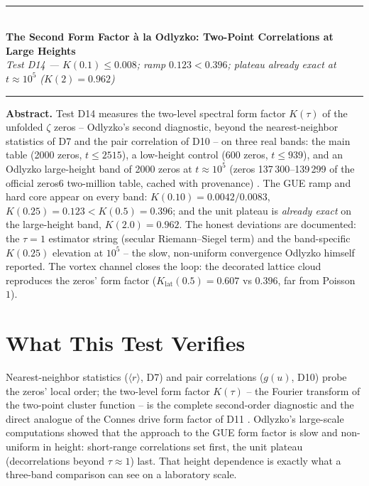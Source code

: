 \documentclass[11pt,a4paper]{article}
\begin{document}
\\[0.3em]
\rule{\textwidth}{0.8pt}\\[0.6em]
{\LARGE\bfseries\color{labblue} The Second Form Factor à la Odlyzko: Two-Point Correlations at Large Heights}\\[0.5em]
{\normalsize\itshape Test D14 — $K(0.1) \le 0.008$; ramp $0.123 < 0.396$; plateau already exact at $t \approx 10^5$ ($K(2) = 0.962$)}\\[0.4em]
\rule{\textwidth}{0.4pt}

\begin{tcolorbox}[colback=labgreen!8, colframe=labgreen!70!black, title={Verdict: PASS — 10/10 checks}, fonttitle=\bfseries, boxrule=0.6pt]
\textbf{Abstract.} Test D14 measures the two-level spectral form factor $K(\tau)$ of the unfolded $\zeta$ zeros -- Odlyzko's second diagnostic, beyond the nearest-neighbor statistics of D7 and the pair correlation of D10 -- on three real bands: the main table (2000 zeros, $t \le 2515$), a low-height control (600 zeros, $t \le 939$), and an Odlyzko large-height band of 2000 zeros at $t \approx 10^{5}$ (zeros 137\,300--139\,299 of the official zeros6 two-million table, cached with provenance) \cite{odlyzko,odlyzko2}. The GUE ramp and hard core appear on every band: $K(0.10) = 0.0042/0.0083$, $K(0.25) = 0.123 < K(0.5) = 0.396$; and the unit plateau is \emph{already exact} on the large-height band, $K(2.0) = 0.962$. The honest deviations are documented: the $\tau = 1$ estimator string (secular Riemann--Siegel term) and the band-specific $K(0.25)$ elevation at $10^5$ -- the slow, non-uniform convergence Odlyzko himself reported. The vortex channel closes the loop: the decorated lattice cloud reproduces the zeros' form factor ($K_{\mathrm{lat}}(0.5) = 0.607$ vs $0.396$, far from Poisson $1$).
\end{tcolorbox}

\section{What This Test Verifies}
Nearest-neighbor statistics ($\langle r\rangle$, D7) and pair correlations ($g(u)$, D10) probe the zeros' local order; the two-level form factor $K(\tau)$ -- the Fourier transform of the two-point cluster function -- is the complete second-order diagnostic and the direct analogue of the Connes drive form factor of D11 \cite{odlyzko,mehta}. Odlyzko's large-scale computations showed that the approach to the GUE form factor is slow and non-uniform in height: short-range correlations set first, the unit plateau (decorrelations beyond $\tau \approx 1$) last. That height dependence is exactly what a three-band comparison can see on a laboratory scale.
\end{document}
